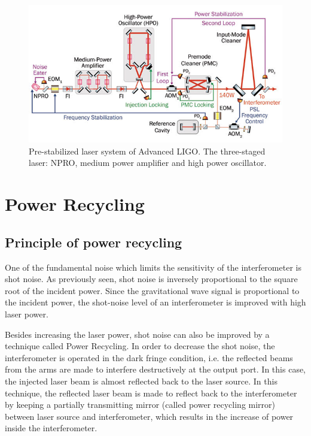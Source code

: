 \documentclass[conference]{IEEEtran}
\begin{document}
\begin{figure}[htbp]
\centerline{\includegraphics[scale=0.38]{FEAT_NPRO_schematic.jpg}}
\caption{Pre-stabilized laser system of Advanced LIGO. The three-staged laser: NPRO, medium power amplifier and high power oscillator\cite{article3}.}

\end{figure}


\section{Power Recycling}
\subsection{Principle of power recycling}

One of the fundamental noise which limits the sensitivity of the interferometer  is shot noise. As previously seen, shot noise is inversely proportional to the square root of the incident power.  Since the gravitational wave signal is proportional to the incident power, the shot-noise level of an interferometer is improved with high laser power.

Besides increasing the laser power, shot noise can also be improved by a technique called Power Recycling. In order to decrease the shot noise, the interferometer is operated in the dark fringe condition, i.e. the reflected beams from the arms are made to interfere destructively at the output port. In this case, the injected laser beam is almost reflected back to the laser source. In this technique, the reflected laser beam is made to reflect back to the interferometer by keeping a partially transmitting mirror (called power recycling mirror) between laser source and interferometer, which results in the increase of power inside the interferometer\cite{Izumi:203yfa}.  
\end{document}
